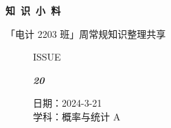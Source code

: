 \documentclass[UTF8]{ctexart}
\newcommand\Black[1]{\textcolor[gray]{0.3}{#1}}
\newcommand\Brown[1]{\textcolor[HTML]{998A4E}{#1}}
\newcommand\IssueNumber{20}
\newcommand\Date{2024-3-21}
\newcommand\Subject{概率与统计 A}
\begin{document}
\BgThispage
\begin{center}
\phantom{...}

{\Large\textcolor{brown!40!white}{}}

\vspace{-2em}

{\Huge\bfseries\TitleFont \Black{知\ 识\ 小\ 料}}


\vspace{-0.1cm}
{\footnotesize \Brown{「电计 2203 班」周常规知识整理共享}}
\end{center}

\vspace{-0.5cm}

\begin{figure}[H]
\hspace{1cm}
\begin{minipage}[t]{0.3\textwidth}
\centering
    \Brown{\Genshin ISSUE}

    \vspace{-0.6cm}
    \Huge \Issue\slshape\bfseries\Black{\IssueNumber}
\end{minipage}
\hfill
\begin{minipage}[t]{0.35\textwidth}
\centering
    \Brown{日期：\Date} \\
\vspace{-0.1cm}
    \Brown{学科：\Subject} \\
\end{minipage}
\hspace{0.8cm}
\end{figure}
\end{document}
